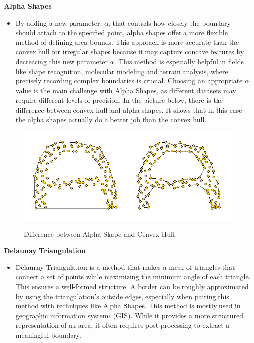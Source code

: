     \textbf{Alpha Shapes}
    \begin{itemize}
        \item By adding a new parameter, $\alpha$, that controls how closely the boundary should attach to the specified point, alpha shapes offer a more flexible method of defining area bounds. This approach is more accurate than the convex hull for irregular shapes because it may capture concave features by decreasing this new parameter $\alpha$. This method is especially helpful in fields like shape recognition, molecular modeling and terrain analysis, where precisely recording complex boundaries is crucial. Choosing an appropriate $\alpha$ value is the main challenge with Alpha Shapes, as different datasets may require different levels of precision. In the picture below, there is the difference between convex hull and alpha shapes. It shows that in this case the alpha shapes actually do a better job than the convex hull. \autocite{Andi:alphaShape}
    \end{itemize} 

    \begin{figure} [H]
        \centering
        \includegraphics [width=.75\textwidth] {images/andreas/areaBorders/alphaShapePic.png}
        \caption{Difference between Alpha Shape and Convex Hull}
        \cite{Andi:alphaShapePic}
    \end{figure}

    \newpage
    
    \textbf{Delaunay Triangulation}
    \begin{itemize}
        \item Delaunay Triangulation is a method that makes a mesh of triangles that connect a set of points while maximizing the minimum angle of each triangle. This ensures a well-formed structure. A border can be roughly approximated by using the triangulation's outside edges, especially when pairing this method with techniques like Alpha Shapes. This method is mostly used in geographic information systems (GIS). While it provides a more structured representation of an area, it often requires post-processing to extract a meaningful boundary.
    \end{itemize} \autocite{Andi:DT}

